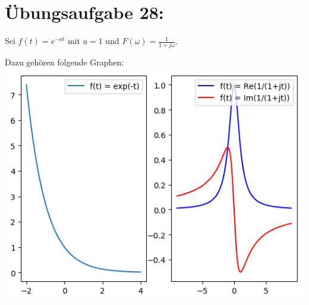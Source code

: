 

	\section*{Übungsaufgabe 28:}
		Sei $f(t) = e^{-at}$ mit $a = 1$ und $F(\omega) = \frac{1}{1+j\omega}$.
		
		Dazu gehören folgende Graphen:\\
		\includegraphics[width=\textwidth]{A28_graphPlot.png}
